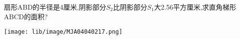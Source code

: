 扇形ABD的半径是4厘米,阴影部分$S_2$比阴影部分$S_1$大2.56平方厘米,求直角梯形ABCD的面积?

\begin{flushright}

    \texttt{[image: lib/image/MJA04040217.png]}

\end{flushright}



